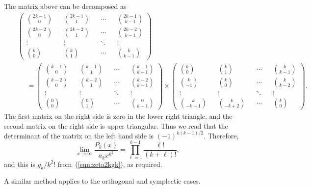 \documentclass[12pt,letterpaper]{amsart}
\theoremstyle{plain}
\theoremstyle{definition}
\theoremstyle{remark}
\numberwithin{equation}{subsection}
\numberwithin{theorem}{subsection}
\numberwithin{table}{subsection}
\begin{document}
The matrix above can be decomposed as
\begin{eqnarray}
&   &\left(\begin{array}{cccccccccccc} \binom{2k-1}{0}&
&\binom{2k-1}{1}&   &\cdots&   &\binom{2k-1}{k-1}
\nonumber \\ \binom{2k-2}{0}&   &\binom{2k-2}{1}&   &\cdots&   &\binom{2k-2}{k-1} \nonumber \\
\vdots&   &\vdots&   &\ddots&   &\vdots \nonumber \\ \binom{k}{0}&
&\binom{k}{1}&   &\cdots&   &\binom{k}{k-1}
\end{array}\right)\nonumber \\
&   &\ \ \ \ \ \  =\left(\begin{array}{cccccccccccc}
\binom{k-1}{0}&   &\binom{k-1}{1}&   &\cdots&   &\binom{k-1}{k-1}
\nonumber \\ \binom{k-2}{0}&   &\binom{k-2}{1}&   &\cdots&   &\binom{k-2}{k-1} \nonumber \\ \vdots&   &\vdots&   &\ddots&   &\vdots \nonumber \\
\binom{0}{0}&   &\binom{0}{1}&   &\cdots&   &\binom{0}{k-1}
\end{array}\right) \times \left(\begin{array}{cccccccccccc}
\binom{k}{0}&   &\binom{k}{1}&   &\cdots&   &\binom{k}{k-1} \nonumber \\
\binom{k}{-1}&   &\binom{k}{0}&   &\cdots&   &\binom{k}{k-2}
\nonumber \\\vdots&   &\vdots&   &\ddots&   &\vdots \nonumber \\
\binom{k}{-k+1}&   &\binom{k}{-k+2}&   &\cdots&   &\binom{k}{0}
\end{array}\right) .
\end{eqnarray}
The first matrix on the right side is zero in the lower right
triangle, and the second matrix on the right side is upper
triangular. Thus we read that the determinant of the matrix on the
left hand side is $(-1)^{k(k-1)/2}$. Therefore,
\begin{equation}
\lim_{x\rightarrow \infty}\frac{P_k(x)}{a_k x^{k^2}}=
\prod_{\ell=1}^{k-1} \frac{\ell!}{(k+\ell)!},
\end{equation}
and this is $g_k/k^2!$ from~(\ref{eqn:zeta2kgk}), as required. 

A similar method applies to the orthogonal and symplectic cases.

\end{document}
